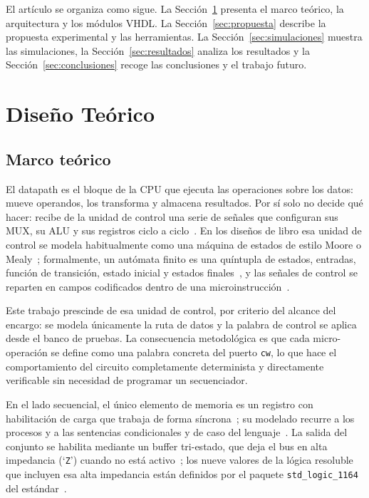 \documentclass[llncs]{llncs}
\begin{document}
El artículo se organiza como sigue. La Sección~\ref{sec:diseno} presenta el
marco teórico, la arquitectura y los módulos VHDL. La
Sección~\ref{sec:propuesta} describe la propuesta experimental y las
herramientas. La Sección~\ref{sec:simulaciones} muestra las simulaciones, la
Sección~\ref{sec:resultados} analiza los resultados y la
Sección~\ref{sec:conclusiones} recoge las conclusiones y el trabajo
futuro.

\section{Diseño Teórico}
\label{sec:diseno}

\subsection{Marco teórico}

El datapath es el bloque de la CPU que ejecuta las operaciones sobre los
datos: mueve operandos, los transforma y almacena resultados. Por sí solo no
decide qué hacer: recibe de la unidad de control una serie de señales que
configuran sus MUX, su ALU y sus registros ciclo a
ciclo~\cite{hamacher2002co,patterson2017cod}. En los diseños de libro esa
unidad de control se modela habitualmente como una máquina de estados de
estilo Moore o Mealy~\cite{mano2016lcdf,harris2015ddca,brown2009fdld,roth2013fld};
formalmente, un autómata finito es una quíntupla de estados, entradas,
función de transición, estado inicial y estados finales~\cite{roth2013fld}, y
las señales de control se reparten en campos codificados dentro de una
microinstrucción~\cite{katz2005cld,wakerly2005ddpp}.

Este trabajo prescinde de esa unidad de control, por criterio del alcance
del encargo: se modela únicamente la ruta de datos y la palabra de control
se aplica desde el banco de pruebas. La consecuencia metodológica es que
cada micro-operación se define como una palabra concreta del puerto
\texttt{cw}, lo que hace el comportamiento del circuito completamente
determinista y directamente verificable sin necesidad de programar un
secuenciador.

En el lado secuencial, el único elemento de memoria es un registro con
habilitación de carga que trabaja de forma síncrona~\cite{mano2016lcdf}; su
modelado recurre a los procesos y a las sentencias condicionales y de caso
del lenguaje~\cite{ashenden2008vhdl}. La salida del conjunto se habilita
mediante un buffer tri-estado, que deja el bus en alta impedancia
(`\texttt{Z}') cuando no está activo~\cite{wakerly2005ddpp};
los nueve valores de la lógica resoluble que incluyen esa alta impedancia
están definidos por el paquete \texttt{std\_logic\_1164} del
estándar~\cite{ieee1164_1993}.
\end{document}
